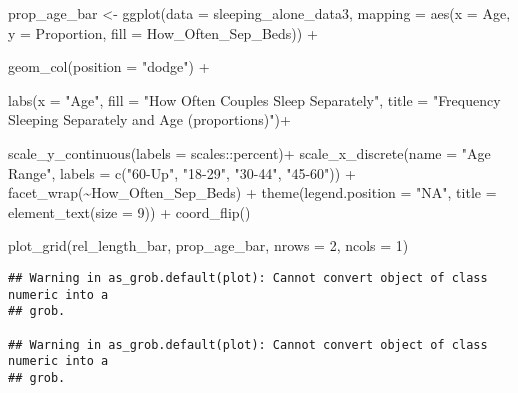 \documentclass[
]{article}
\newenvironment{Shaded}{\begin{snugshade}}{\end{snugshade}}
\newcommand{\AttributeTok}[1]{\textcolor[rgb]{0.77,0.63,0.00}{#1}}
\newcommand{\DecValTok}[1]{\textcolor[rgb]{0.00,0.00,0.81}{#1}}
\newcommand{\FunctionTok}[1]{\textcolor[rgb]{0.00,0.00,0.00}{#1}}
\newcommand{\NormalTok}[1]{#1}
\newcommand{\OtherTok}[1]{\textcolor[rgb]{0.56,0.35,0.01}{#1}}
\newcommand{\SpecialCharTok}[1]{\textcolor[rgb]{0.00,0.00,0.00}{#1}}
\newcommand{\StringTok}[1]{\textcolor[rgb]{0.31,0.60,0.02}{#1}}
\begin{document}
\begin{Shaded}
\begin{Highlighting}[]
\NormalTok{prop\_age\_bar }\OtherTok{\textless{}{-}} \FunctionTok{ggplot}\NormalTok{(}\AttributeTok{data =}\NormalTok{ sleeping\_alone\_data3,}
                            \AttributeTok{mapping =} \FunctionTok{aes}\NormalTok{(}\AttributeTok{x =}\NormalTok{ Age,}
                                          \AttributeTok{y =}\NormalTok{ Proportion, }
                                          \AttributeTok{fill =}\NormalTok{ How\_Often\_Sep\_Beds)) }\SpecialCharTok{+}
  
                     \FunctionTok{geom\_col}\NormalTok{(}\AttributeTok{position =} \StringTok{"dodge"}\NormalTok{) }\SpecialCharTok{+} 
  
                     \FunctionTok{labs}\NormalTok{(}\AttributeTok{x =} \StringTok{"Age"}\NormalTok{,}
                          \AttributeTok{fill =} \StringTok{"How Often Couples Sleep Separately"}\NormalTok{, }
                          \AttributeTok{title =} \StringTok{"Frequency Sleeping Separately and Age (proportions)"}\NormalTok{)}\SpecialCharTok{+}
  
                    \FunctionTok{scale\_y\_continuous}\NormalTok{(}\AttributeTok{labels =}\NormalTok{ scales}\SpecialCharTok{::}\NormalTok{percent)}\SpecialCharTok{+} 
                    \FunctionTok{scale\_x\_discrete}\NormalTok{(}\AttributeTok{name =} \StringTok{"Age Range"}\NormalTok{, }\AttributeTok{labels =} \FunctionTok{c}\NormalTok{(}\StringTok{"60{-}Up"}\NormalTok{, }\StringTok{"18{-}29"}\NormalTok{, }\StringTok{"30{-}44"}\NormalTok{, }\StringTok{"45{-}60"}\NormalTok{)) }\SpecialCharTok{+}
                    \FunctionTok{facet\_wrap}\NormalTok{(}\SpecialCharTok{\textasciitilde{}}\NormalTok{How\_Often\_Sep\_Beds) }\SpecialCharTok{+}
                    \FunctionTok{theme}\NormalTok{(}\AttributeTok{legend.position =} \StringTok{"NA"}\NormalTok{, }
                          \AttributeTok{title =} \FunctionTok{element\_text}\NormalTok{(}\AttributeTok{size =} \DecValTok{9}\NormalTok{)) }\SpecialCharTok{+}
                    \FunctionTok{coord\_flip}\NormalTok{()}


\FunctionTok{plot\_grid}\NormalTok{(rel\_length\_bar, prop\_age\_bar, }\AttributeTok{nrows =} \DecValTok{2}\NormalTok{, }\AttributeTok{ncols =} \DecValTok{1}\NormalTok{) }
\end{Highlighting}
\end{Shaded}

\begin{verbatim}
## Warning in as_grob.default(plot): Cannot convert object of class numeric into a
## grob.

## Warning in as_grob.default(plot): Cannot convert object of class numeric into a
## grob.
\end{verbatim}
\end{document}
